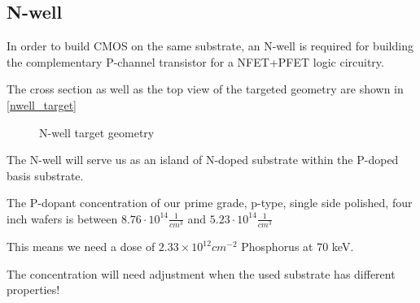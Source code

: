 \subsection{N-well}\label{nwell_chapter}
In order to build CMOS on the same substrate, an N-well is required for building the complementary P-channel transistor for a NFET+PFET logic circuitry.

The cross section as well as the top view of the targeted geometry are shown in \autoref{nwell_target}

\begin{figure}[H]
	\centering
	\begin{tikzpicture}[node distance = 3cm, auto, thick,scale=\CrossAndTopSectionBig, every node/.style={transform shape}]
		
	\end{tikzpicture}
	\begin{tikzpicture}[node distance = 3cm, auto, thick,scale=\CrossAndTopSectionBig, every node/.style={transform shape}]
		
	\end{tikzpicture}
	\caption{N-well target geometry}
	\label{nwell_target}
\end{figure}

The N-well will serve us as an island of N-doped substrate within the P-doped basis substrate.

The P-dopant concentration of our prime grade, p-type, single side polished, four inch wafers is between $8.76 \cdot 10^{14} \frac{1}{cm^3}$ and $5.23 \cdot 10^{14} \frac{1}{cm^3}$

This means we need a dose of $2.33\times10^{12}cm^{-2}$ Phosphorus at 70 keV.

The concentration will need adjustment when the used substrate has different properties!
